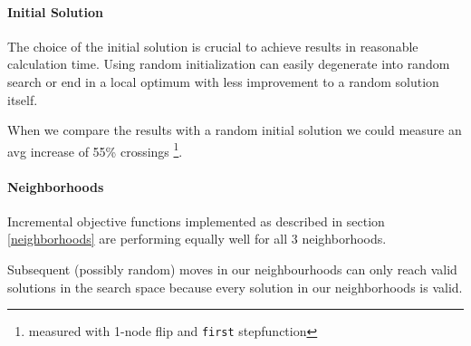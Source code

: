 \documentclass{scrartcl}
\begin{document}
\paragraph{Initial Solution}
The choice of the initial solution is crucial to achieve results in reasonable calculation time.
Using random initialization can easily degenerate into random search or end in a 
local optimum with less improvement to a random solution itself.



When we compare the results with a random initial solution we could
measure an avg increase of 55\% crossings
\footnote{measured with 1-node flip and \texttt{first} stepfunction}.
%

%




\paragraph{Neighborhoods}
Incremental objective functions implemented as described in section \ref{neighborhoods}
are performing equally well for all 3 neighborhoods.

Subsequent (possibly random) moves in our neighbourhoods can only reach
valid solutions in the search space because every solution in our neighborhoods
is valid.
\end{document}
